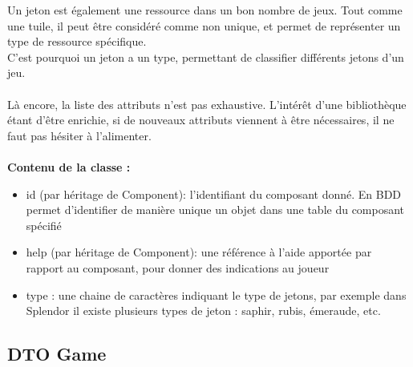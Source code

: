 \documentclass{article}
\begin{document}
                Un jeton est également une ressource dans un bon nombre de jeux. Tout comme une tuile, il peut être considéré comme non unique, et permet de représenter un type de ressource spécifique. \\
                \indent C'est pourquoi un jeton a un type, permettant de classifier différents jetons d'un jeu.\\
                \\
                \indent Là encore, la liste des attributs n'est pas exhaustive. L'intérêt d'une bibliothèque étant d'être enrichie, si de nouveaux attributs viennent à être nécessaires, il ne faut pas hésiter à l'alimenter.\\
                \\
                \textbf{Contenu de la classe :}
                \begin{itemize}
                    \item id (par héritage de Component): l'identifiant du composant donné. En BDD permet d'identifier de manière unique un objet dans une table du composant spécifié
                    \item help (par héritage de Component): une référence à l'aide apportée par rapport au composant, pour donner des indications au joueur
                    \item type : une chaine de caractères indiquant le type de jetons, par exemple dans Splendor il existe plusieurs types de jeton : saphir, rubis, émeraude, etc.
                \end{itemize}

            \subsection{DTO Game}
\end{document}
